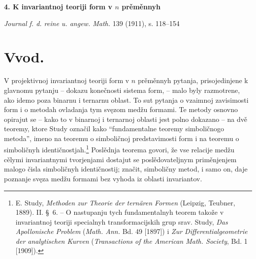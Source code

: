 \documentclass[11pt]{article}
\begin{document}
\begin{center}
{\Large\bfseries 4. K invariantnoj teoriji form v $n$ prěměnnyh}\par
\vspace{1.2em}
\emph{Journal f. d. reine u. angew. Math.} 139 (1911), s. 118--154
\end{center}

\section*{Vvod.}
V projektivnoj invariantnoj teoriji form v $n$ prěměnnyh pytanja, prisojedinjene k glavnomu pytanju -- dokazu konečnosti sistema form, -- malo byly razmotrene, ako idemo poza binarnu i ternarnu oblast. To sut pytanja o vzaimnoj zavisimosti form i o metodah ovladanja tym svęzom medžu formami. Te metody osnovno opirajut se -- kako to v binarnoj i ternarnoj oblasti jest polno dokazano -- na dvě teoremy, ktore Study označil kako ``fundamentalne teoremy simboličnogo metoda'', imeno na teoremu o simboličnoj predstavimosti form i na teoremu o simboličnyh identičnostjah.\footnote{E. Study, \emph{Methoden zur Theorie der ternären Formen} (Leipzig, Teubner, 1889). II. \S\ 6. -- O nastupanju tych fundamentalnyh teorem takože v invariantnoj teoriji specialnyh transformacijskih grup srav. Study, \emph{Das Apollonische Problem} (\emph{Math. Ann.} Bd. 49 [1897]) i \emph{Zur Differentialgeometrie der analytischen Kurven} (\emph{Transactions of the American Math. Society}, Bd. 1 [1909]).} Poslědnja teorema govori, že vse relacije medžu cělymi invariantnymi tvorjenjami dostajut se poslědovateljnym priměnjenjem malogo čisla simboličnyh identičnostij; značit, simboličny metod, i samo on, daje poznanje svęza medžu formami bez vyhoda iz oblasti invariantov.
\end{document}
